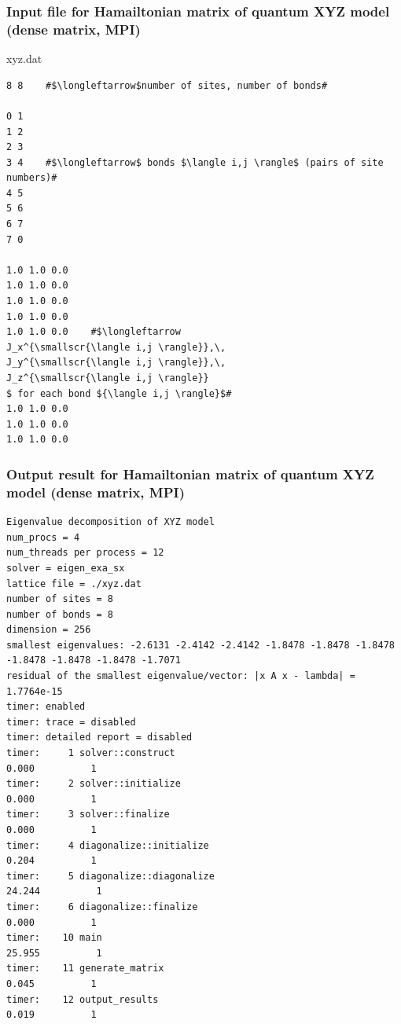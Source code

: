 \begin{frame}[c,fragile]
  \frametitle{Input file for Hamailtonian matrix of quantum XYZ model (dense matrix, MPI)}
xyz.dat
\begin{lstlisting}[style=shstyle]
8 8    #$\longleftarrow$number of sites, number of bonds#

0 1
1 2
2 3
3 4    #$\longleftarrow$ bonds $\langle i,j \rangle$ (pairs of site numbers)#
4 5
5 6
6 7
7 0

1.0 1.0 0.0
1.0 1.0 0.0
1.0 1.0 0.0
1.0 1.0 0.0
1.0 1.0 0.0    #$\longleftarrow
J_x^{\smallscr{\langle i,j \rangle}},\, 
J_y^{\smallscr{\langle i,j \rangle}},\,
J_z^{\smallscr{\langle i,j \rangle}}
$ for each bond ${\langle i,j \rangle}$#
1.0 1.0 0.0
1.0 1.0 0.0
1.0 1.0 0.0
\end{lstlisting}
\end{frame}

\begin{frame}[c,fragile]
  \frametitle{Output result for Hamailtonian matrix of quantum XYZ model (dense matrix, MPI)}
\begin{lstlisting}[style=shstyle]
Eigenvalue decomposition of XYZ model
num_procs = 4
num_threads per process = 12
solver = eigen_exa_sx
lattice file = ./xyz.dat
number of sites = 8
number of bonds = 8
dimension = 256
smallest eigenvalues: -2.6131 -2.4142 -2.4142 -1.8478 -1.8478 -1.8478 -1.8478 -1.8478 -1.8478 -1.7071
residual of the smallest eigenvalue/vector: |x A x - lambda| = 1.7764e-15
timer: enabled
timer: trace = disabled
timer: detailed report = disabled
timer:     1 solver::construct                                              0.000          1
timer:     2 solver::initialize                                             0.000          1
timer:     3 solver::finalize                                               0.000          1
timer:     4 diagonalize::initialize                                        0.204          1
timer:     5 diagonalize::diagonalize                                      24.244          1
timer:     6 diagonalize::finalize                                          0.000          1
timer:    10 main                                                          25.955          1
timer:    11 generate_matrix                                                0.045          1
timer:    12 output_results                                                 0.019          1
\end{lstlisting}
\end{frame}

